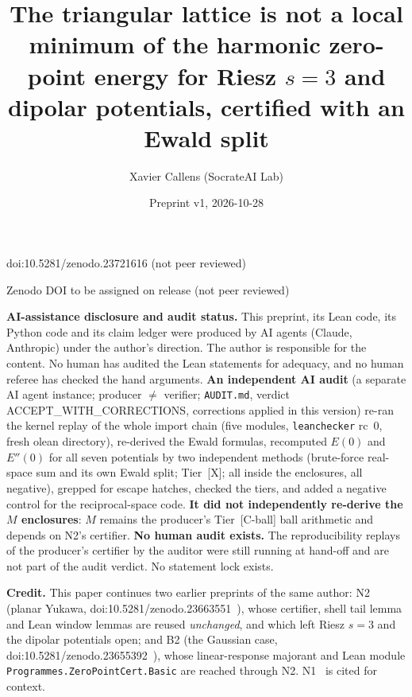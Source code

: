 \documentclass[11pt]{article}
\title{The triangular lattice is not a local minimum of the harmonic zero-point energy for Riesz $s=3$ and dipolar potentials, certified with an Ewald split}
\author{Xavier Callens (SocrateAI Lab)}
\date{Preprint v1, 2026-10-28}
\newcommand{\tier}[1]{\textsf{[#1]}}
\newcommand{\tCb}{\tier{C-ball}}
\newcommand{\tX}{\tier{X}}
\newcommand{\lean}[1]{\texttt{#1}}
\begin{document}
\maketitle
\begin{center}\small doi:10.5281/zenodo.23721616 \quad (not peer reviewed)\end{center}

\begin{center}\small Zenodo DOI to be assigned on release \quad (not peer reviewed)\end{center}

\noindent\textbf{AI-assistance disclosure and audit status.} This preprint, its Lean code, its Python code and its claim ledger were
produced by AI agents (Claude, Anthropic) under the author's direction. The author is responsible for the content. No human
has audited the Lean statements for adequacy, and no human referee has checked the hand arguments.
\textbf{An independent AI audit} (a separate AI agent instance; producer $\ne$ verifier; \texttt{AUDIT.md}, verdict ACCEPT\_WITH\_CORRECTIONS, corrections applied in this version) re-ran the kernel replay of the whole import chain (five modules, \texttt{leanchecker} rc~0, fresh olean directory), re-derived the Ewald formulas, recomputed $E(0)$ and $E''(0)$ for all seven potentials by two independent methods (brute-force real-space sum and its own Ewald split; Tier~\tX{}; all inside the enclosures, all negative), grepped for escape hatches, checked the tiers, and added a negative control for the reciprocal-space code. \textbf{It did not independently re-derive the $M$ enclosures}: $M$ remains the producer's Tier~\tCb{} ball arithmetic and depends on N2's certifier. \textbf{No human audit exists.} The reproducibility replays of the producer's certifier by the auditor were still running at hand-off and are not part of the audit verdict. No statement lock exists.

\medskip
\noindent\textbf{Credit.} This paper continues two earlier preprints of the same author: N2 (planar Yukawa, doi:10.5281/zenodo.23663551~\cite{n2}), whose certifier,
shell tail lemma and Lean window lemmas are reused \emph{unchanged}, and which left Riesz $s=3$ and the dipolar potentials open; and B2 (the Gaussian case,
doi:10.5281/zenodo.23655392~\cite{b2}), whose linear-response majorant and Lean module \lean{Programmes.ZeroPointCert.Basic} are reached through N2. N1~\cite{n1} is cited for context.
\end{document}
